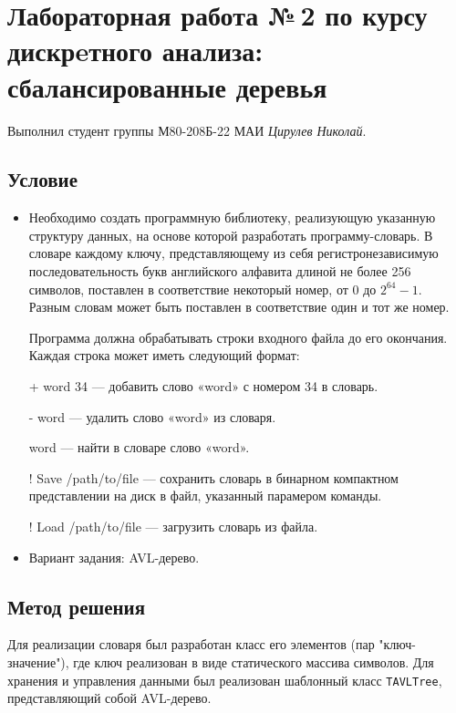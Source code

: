 \documentclass[12pt]{article}
\begin{document}
\section*{Лабораторная работа №\,2 по курсу дискрeтного анализа: сбалансированные деревья}

Выполнил студент группы М80-208Б-22 МАИ \textit{Цирулев Николай}.

\subsection*{Условие}
\begin{itemize}
\item


    Необходимо создать программную библиотеку, реализующую указанную структуру данных, на основе которой разработать программу-словарь. В словаре каждому ключу, представляющему из себя регистронезависимую последовательность букв английского алфавита длиной не более 256 символов, поставлен в соответствие некоторый номер, от 0 до $2^{64} - 1$. Разным словам может быть поставлен в соответствие один и тот же номер.

    Программа должна обрабатывать строки входного файла до его окончания. Каждая строка может иметь следующий формат:
    
    + word 34 — добавить слово «word» с номером 34 в словарь. 
    
    - word — удалить слово «word» из словаря. 
    
    word — найти в словаре слово «word». 
    
    ! Save /path/to/file — сохранить словарь в бинарном компактном представлении на диск в файл, указанный парамером команды. 
    
    ! Load /path/to/file — загрузить словарь из файла. 

\item
    Вариант задания: AVL-дерево.
\end{itemize}

\subsection*{Метод решения}

Для реализации словаря был разработан класс его элементов (пар "ключ-значение"), где ключ реализован в виде статического массива символов. Для хранения и управления данными был реализован шаблонный класс \texttt{TAVLTree}, представляющий собой AVL-дерево.
\end{document}
